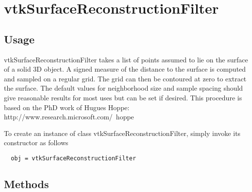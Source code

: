 \section{vtkSurfaceReconstructionFilter}

\subsection{Usage}

 vtkSurfaceReconstructionFilter takes a list of points assumed to lie on
 the surface of a solid 3D object. A signed measure of the distance to the
 surface is computed and sampled on a regular grid. The grid can then be
 contoured at zero to extract the surface. The default values for
 neighborhood size and sample spacing should give reasonable results for
 most uses but can be set if desired. This procedure is based on the PhD
 work of Hugues Hoppe: http://www.research.microsoft.com/~hoppe

To create an instance of class vtkSurfaceReconstructionFilter, simply
invoke its constructor as follows
\begin{verbatim}
  obj = vtkSurfaceReconstructionFilter
\end{verbatim}
\subsection{Methods}

